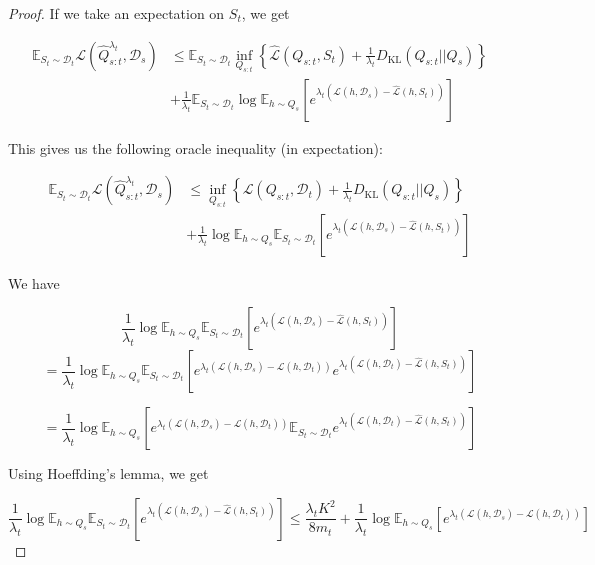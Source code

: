 \documentclass{article}
\theoremstyle{plain}
\theoremstyle{definition}
\theoremstyle{remark}
\begin{document}
\begin{proof}
If we take an expectation on $S_t$, we get

\begin{equation*} 
\begin{split}
\mathbb{E}_{S_t\sim \mathcal{D}_t}\mathcal{L}( \hat{Q}^{\lambda_t}_{s:t},\mathcal{D}_s)&\leq \mathbb{E}_{S_t\sim \mathcal{D}_t}\inf_{Q_{s:t}}\left \{ \hat{\mathcal{L}}(Q_{s:t},S_t) + \frac{1}{\lambda_t}D_{\mathrm{KL}}(Q_{s:t}||Q_{s}) \right \}\\&+\frac{1}{\lambda_t}\mathbb{E}_{S_t\sim \mathcal{D}_t}\log\mathbb{E}_{h\sim Q_s}\left [e^{\lambda_t(\mathcal{L}(h,\mathcal{D}_s)-\hat{\mathcal{L}}(h,S_t))} \right ]
\end{split}
\end{equation*}


This gives us the following oracle inequality (in expectation):

\begin{equation*} 
\begin{split}
\mathbb{E}_{S_t\sim \mathcal{D}_t}\mathcal{L}( \hat{Q}^{\lambda_t}_{s:t},\mathcal{D}_s)&\leq \inf_{Q_{s:t}}\left \{ \mathcal{L}(Q_{s:t},\mathcal{D}_t) + \frac{1}{\lambda_t}D_{\mathrm{KL}}(Q_{s:t}||Q_{s}) \right \}\\&+\frac{1}{\lambda_t}\log\mathbb{E}_{h\sim Q_s}\mathbb{E}_{S_t\sim \mathcal{D}_t}\left [e^{\lambda_t(\mathcal{L}(h,\mathcal{D}_s)-\hat{\mathcal{L}}(h,S_t))} \right ]
\end{split}
\end{equation*}

We have

$$\frac{1}{\lambda_t}\log\mathbb{E}_{h\sim Q_s}\mathbb{E}_{S_t\sim \mathcal{D}_t}\left [e^{\lambda_t(\mathcal{L}(h,\mathcal{D}_s)-\hat{\mathcal{L}}(h,S_t))} \right ]$$
$$=\frac{1}{\lambda_t}\log\mathbb{E}_{h\sim Q_s}\mathbb{E}_{S_t\sim \mathcal{D}_t}\left [e^{\lambda_t(\mathcal{L}(h,\mathcal{D}_s)-\mathcal{L}(h,\mathcal{D}_t))}e^{\lambda_t(\mathcal{L}(h,\mathcal{D}_t)-\hat{\mathcal{L}}(h,S_t))} \right ]$$

$$=\frac{1}{\lambda_t}\log\mathbb{E}_{h\sim Q_s}\left [e^{\lambda_t(\mathcal{L}(h,\mathcal{D}_s)-\mathcal{L}(h,\mathcal{D}_t))}\mathbb{E}_{S_t\sim \mathcal{D}_t}e^{\lambda_t(\mathcal{L}(h,\mathcal{D}_t)-\hat{\mathcal{L}}(h,S_t))} \right ]$$

Using Hoeffding's lemma, we get

$$\frac{1}{\lambda_t}\log\mathbb{E}_{h\sim Q_s}\mathbb{E}_{S_t\sim \mathcal{D}_t}\left [e^{\lambda_t(\mathcal{L}(h,\mathcal{D}_s)-\hat{\mathcal{L}}(h,S_t))} \right ] \leq \frac{\lambda_t K^2}{8m_t}+\frac{1}{\lambda_t}\log\mathbb{E}_{h\sim Q_s}\left [e^{\lambda_t(\mathcal{L}(h,\mathcal{D}_s)-\mathcal{L}(h,\mathcal{D}_t))} \right ]$$

\end{proof}
\end{document}
